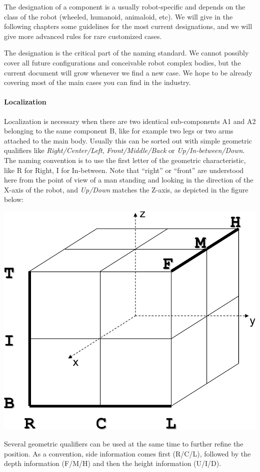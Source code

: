 The designation of a component is a usually robot-specific and depends
on the class of the robot (wheeled, humanoid, animaloid, etc). We will
give in the following chapters some guidelines for the most current
designations, and we will give more advanced rules for rare customized
cases.


The designation is the critical part of the naming standard. We cannot
possibly cover all future configurations and conceivable robot complex
bodies, but the current document will grow whenever we find a new
case.  We hope to be already covering most of the main cases you can
find in the industry.

\paragraph{Localization}

Localization is necessary when there are two identical sub-components
A1 and A2 belonging to the same component B, like for example two legs
or two arms attached to the main body. Usually this can be sorted out
with simple geometric qualifiers like \textit{Right/Center/Left},
\textit{Front/Middle/Back} or \textit{Up/In-between/Down}. The naming
convention is to use the first letter of the geometric characteristic,
like R for Right, I for In-between.  Note that “right” or “front” are
understood here from the point of view of a man standing and looking
in the direction of the X-axis of the robot, and \textit{Up/Down}
matches the Z-axis, as depicted in the figure below:

\begin{center}
  \includegraphics[width=.5\linewidth]{img/cube}
\end{center}

Several geometric qualifiers can be used at the same time to further
refine the position. As a convention, side information comes first
(R/C/L), followed by the depth information (F/M/H) and then the height
information (U/I/D).

